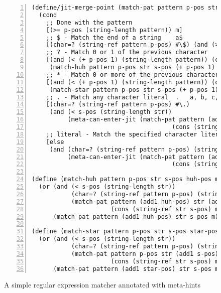 \begin{figure}[!htbp]
\centering
\begin{minipage}{\textwidth}
\begin{lstlisting}[language=racket,
                basicstyle=\ttfamily\footnotesize,
                numbers=left, xleftmargin=2em]
(define/jit-merge-point (match-pat pattern p-pos str s-pos m)
  (cond
    ;; Done with the pattern
    [(>= p-pos (string-length pattern)) m]
    ;; $ - Match the end of a string 	a$
    [(char=? (string-ref pattern p-pos) #\$) (and (>= s-pos (string-length str)) m)]
    ;; ? - Match 0 or 1 of the previous character 	a? 	"", a
    [(and (< (+ p-pos 1) (string-length pattern)) (char=? (string-ref pattern (+ p-pos 1)) #\?))
     (match-huh pattern p-pos str s-pos (+ p-pos 1) m)]
    ;; * - Match 0 or more of the previous character 	a* 	"", a, aa, aaa
    [(and (< (+ p-pos 1) (string-length pattern)) (char=? (string-ref pattern (+ p-pos 1)) #\*))
     (match-star pattern p-pos str s-pos (+ p-pos 1) m)]
    ;; . - Match any character literal 	. 	a, b, c, d, e ...
    [(char=? (string-ref pattern p-pos) #\.)
     (and (< s-pos (string-length str))
          (meta-can-enter-jit (match-pat pattern (add1 p-pos) str (add1 s-pos)
                                       (cons (string-ref str s-pos) m))))]
    ;; literal - Match the specified character literal 	x, q
    [else
     (and (char=? (string-ref pattern p-pos) (string-ref str s-pos))
          (meta-can-enter-jit (match-pat pattern (add1 p-pos) str (add1 s-pos)
                                       (cons (string-ref str s-pos) m))))]))

(define (match-huh pattern p-pos str s-pos huh-pos m)
  (or (and (< s-pos (string-length str))
           (char=? (string-ref pattern p-pos) (string-ref str s-pos))
           (match-pat pattern (add1 huh-pos) str (add1 s-pos)
                      (cons (string-ref str s-pos) m)))
      (match-pat pattern (add1 huh-pos) str s-pos m)))

(define (match-star pattern p-pos str s-pos star-pos m)
  (or (and (< s-pos (string-length str))
           (char=? (string-ref pattern p-pos) (string-ref str s-pos))
           (match-pat pattern p-pos str (add1 s-pos)
                      (cons (string-ref str s-pos) m)))
      (match-pat pattern (add1 star-pos) str s-pos m)))
\end{lstlisting}
\end{minipage}
\caption{A simple regular expression matcher annotated with meta-hints}
\label{fig:regexp-annotated-with-meta-hints}
\end{figure}